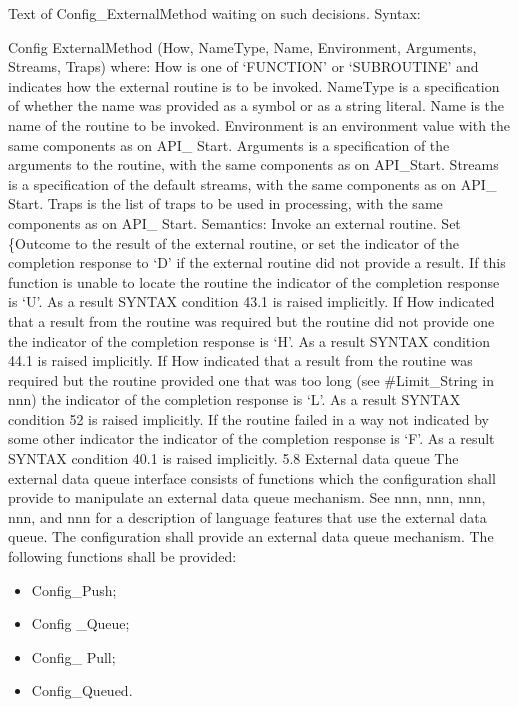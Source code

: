 Text of Config\_ExternalMethod waiting on such decisions. Syntax:

Config ExternalMethod (How, NameType, Name, Environment, Arguments,
Streams, Traps) where: How is one of `FUNCTION' or `SUBROUTINE' and
indicates how the external routine is to be invoked. NameType is a
specification of whether the name was provided as a symbol or as a
string literal. Name is the name of the routine to be invoked.
Environment is an environment value with the same components as on API\_
Start. Arguments is a specification of the arguments to the routine,
with the same components as on API\_Start. Streams is a specification of
the default streams, with the same components as on API\_ Start. Traps
is the list of traps to be used in processing, with the same components
as on API\_ Start. Semantics: Invoke an external routine. Set \{Outcome
to the result of the external routine, or set the indicator of the
completion response to `D' if the external routine did not provide a
result. If this function is unable to locate the routine the indicator
of the completion response is `U'. As a result SYNTAX condition 43.1 is
raised implicitly. If How indicated that a result from the routine was
required but the routine did not provide one the indicator of the
completion response is `H'. As a result SYNTAX condition 44.1 is raised
implicitly. If How indicated that a result from the routine was required
but the routine provided one that was too long (see \#Limit\_String in
nnn) the indicator of the completion response is `L'. As a result SYNTAX
condition 52 is raised implicitly. If the routine failed in a way not
indicated by some other indicator the indicator of the completion
response is `F'. As a result SYNTAX condition 40.1 is raised implicitly.
5.8 External data queue The external data queue interface consists of
functions which the configuration shall provide to manipulate an
external data queue mechanism. See nnn, nnn, nnn, nnn, and nnn for a
description of language features that use the external data queue. The
configuration shall provide an external data queue mechanism. The
following functions shall be provided:

\begin{itemize}
\item
  Config\_Push;
\item
  Config \_Queue;
\item
  Config\_ Pull;
\item
  Config\_Queued.
\end{itemize}

